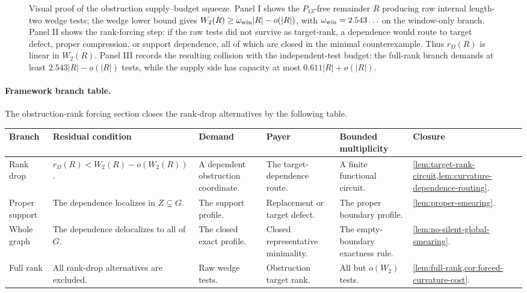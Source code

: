 \documentclass[11pt]{article}
\newcommand{\FrameworkBranchTableHeader}{%
\toprule
\textbf{Branch} & \textbf{Residual condition} & \textbf{Demand} & \textbf{Payer} & \textbf{Bounded multiplicity} & \textbf{Closure}\\
\midrule
}
\begin{document}
\begin{figure}[t]
{%
}
\caption[Visual proof of the obstruction supply--budget squeeze]{Visual proof of the obstruction supply--budget squeeze.  Panel I shows the \(P_{13}\)-free remainder \(R\) producing raw internal length-two wedge tests; the wedge lower bound gives \(W_2(R)\ge\omega_{\rm win}|R|-o(|R|)\), with \(\omega_{\rm win}=2.543\ldots\) on the window-only branch.  Panel II shows the rank-forcing step: if the raw tests did not survive as target-rank, a dependence would route to target defect, proper compression, or support dependence, all of which are closed in the minimal counterexample.  Thus \(r_\Omega(R)\) is linear in \(W_2(R)\).  Panel III records the resulting collision with the independent-test budget: the full-rank branch demands at least \(2.543|R|-o(|R|)\) tests, while the supply side has capacity at most \(0.611|R|+o(|R|)\).}
\label{fig:curvature-budget-squeeze}
\end{figure}

\paragraph{Framework branch table.}
The obstruction-rank forcing section closes the rank-drop alternatives by the
following table.
\begin{longtable}{L{0.13\textwidth} L{0.19\textwidth} L{0.14\textwidth} L{0.14\textwidth} L{0.17\textwidth} L{0.17\textwidth}}
\FrameworkBranchTableHeader
Rank drop
&
\(r_\Omega(R)<W_2(R)-o(W_2(R))\).
&
A dependent obstruction coordinate.
&
The target-dependence route.
&
A finite functional circuit.
&
\cref{lem:target-rank-circuit,lem:curvature-dependence-routing}.
\\
\addlinespace
Proper support
&
The dependence localizes in \(Z\subsetneq G\).
&
The support profile.
&
Replacement or target defect.
&
The proper boundary profile.
&
\cref{lem:proper-smearing}.
\\
\addlinespace
Whole graph
&
The dependence delocalizes to all of \(G\).
&
The closed exact profile.
&
Closed representative minimality.
&
The empty-boundary exactness rule.
&
\cref{lem:no-silent-global-smearing}.
\\
\addlinespace
Full rank
&
All rank-drop alternatives are excluded.
&
Raw wedge tests.
&
Obstruction target rank.
&
All but \(o(W_2)\) tests.
&
\cref{lem:full-rank,cor:forced-curvature-cost}.
\\
\bottomrule
\end{longtable}
\end{document}
